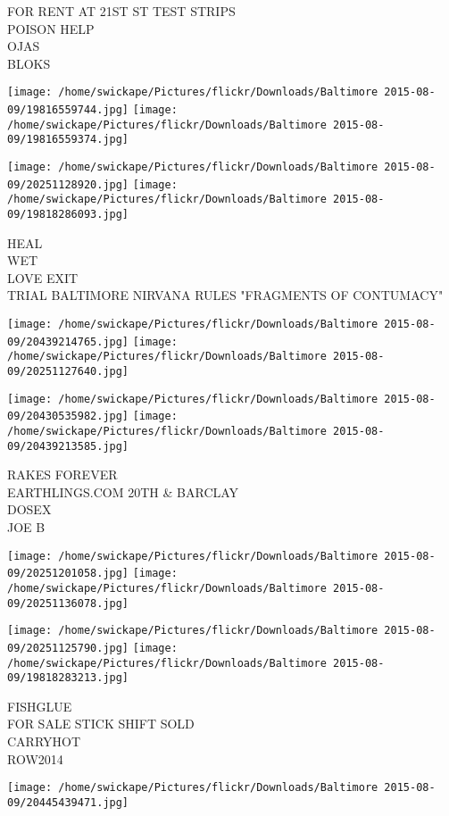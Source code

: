 \documentclass[10pt,letterpaper]{article}
\begin{document}
FOR RENT AT 21ST ST TEST STRIPS\\
POISON HELP\\
OJAS\\
BLOKS
\pagebreak

\texttt{[image: /home/swickape/Pictures/flickr/Downloads/Baltimore 2015-08-09/19816559744.jpg]}
\texttt{[image: /home/swickape/Pictures/flickr/Downloads/Baltimore 2015-08-09/19816559374.jpg]}

\texttt{[image: /home/swickape/Pictures/flickr/Downloads/Baltimore 2015-08-09/20251128920.jpg]}
\texttt{[image: /home/swickape/Pictures/flickr/Downloads/Baltimore 2015-08-09/19818286093.jpg]}

HEAL\\
WET\\
LOVE EXIT\\
TRIAL BALTIMORE NIRVANA RULES "FRAGMENTS OF CONTUMACY"
\pagebreak

\texttt{[image: /home/swickape/Pictures/flickr/Downloads/Baltimore 2015-08-09/20439214765.jpg]}
\texttt{[image: /home/swickape/Pictures/flickr/Downloads/Baltimore 2015-08-09/20251127640.jpg]}

\texttt{[image: /home/swickape/Pictures/flickr/Downloads/Baltimore 2015-08-09/20430535982.jpg]}
\texttt{[image: /home/swickape/Pictures/flickr/Downloads/Baltimore 2015-08-09/20439213585.jpg]}

RAKES FOREVER\\
EARTHLINGS.COM 20TH \& BARCLAY\\
DOSEX\\
JOE B
\pagebreak

\texttt{[image: /home/swickape/Pictures/flickr/Downloads/Baltimore 2015-08-09/20251201058.jpg]}
\texttt{[image: /home/swickape/Pictures/flickr/Downloads/Baltimore 2015-08-09/20251136078.jpg]}

\texttt{[image: /home/swickape/Pictures/flickr/Downloads/Baltimore 2015-08-09/20251125790.jpg]}
\texttt{[image: /home/swickape/Pictures/flickr/Downloads/Baltimore 2015-08-09/19818283213.jpg]}

FISHGLUE\\
FOR SALE STICK SHIFT SOLD\\
CARRYHOT\\
ROW2014
\pagebreak

\texttt{[image: /home/swickape/Pictures/flickr/Downloads/Baltimore 2015-08-09/20445439471.jpg]}
\end{document}
